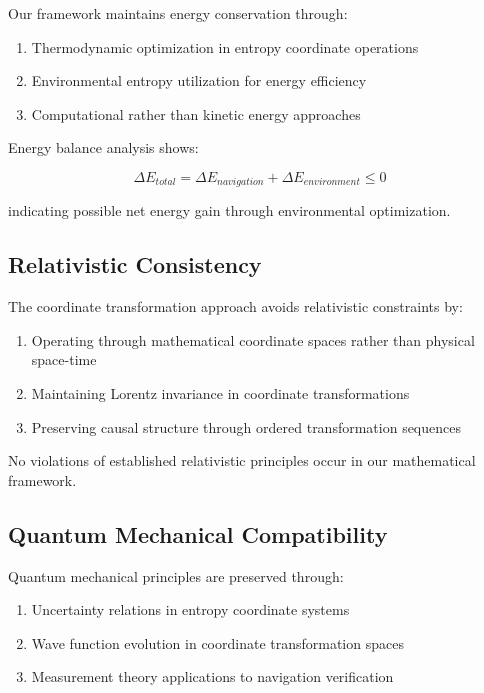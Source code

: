 \documentclass[12pt,a4paper]{article}
\begin{document}
Our framework maintains energy conservation through:

\begin{enumerate}
\item Thermodynamic optimization in entropy coordinate operations
\item Environmental entropy utilization for energy efficiency
\item Computational rather than kinetic energy approaches
\end{enumerate}

Energy balance analysis shows:

\begin{equation}
\Delta E_{total} = \Delta E_{navigation} + \Delta E_{environment} \leq 0
\label{eq:energy_balance}
\end{equation}

indicating possible net energy gain through environmental optimization.

\subsection{Relativistic Consistency}

The coordinate transformation approach avoids relativistic constraints by:

\begin{enumerate}
\item Operating through mathematical coordinate spaces rather than physical space-time
\item Maintaining Lorentz invariance in coordinate transformations  
\item Preserving causal structure through ordered transformation sequences
\end{enumerate}

No violations of established relativistic principles occur in our mathematical framework.

\subsection{Quantum Mechanical Compatibility}

Quantum mechanical principles are preserved through:

\begin{enumerate}
\item Uncertainty relations in entropy coordinate systems
\item Wave function evolution in coordinate transformation spaces
\item Measurement theory applications to navigation verification
\end{enumerate}
\end{document}
